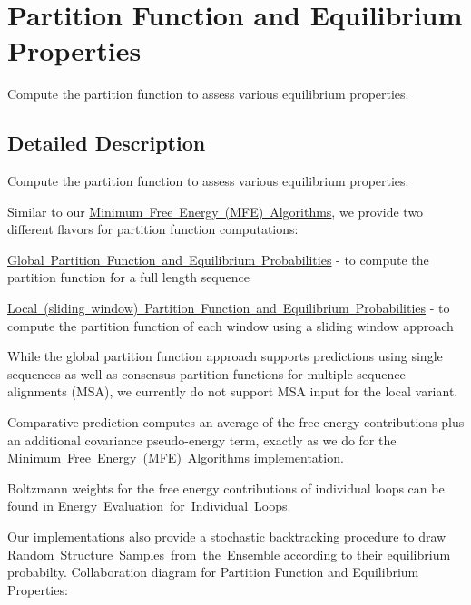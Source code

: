 \hypertarget{group__pf__fold}{}\section{Partition Function and Equilibrium Properties}
\label{group__pf__fold}


Compute the partition function to assess various equilibrium properties.  




\subsection{Detailed Description}
Compute the partition function to assess various equilibrium properties. 

Similar to our \mbox{\hyperlink{group__mfe}{Minimum Free Energy (M\+FE) Algorithms}}, we provide two different flavors for partition function computations\+:
\begin{DoxyItemize}
\item \mbox{\hyperlink{group__part__func__global}{Global Partition Function and Equilibrium Probabilities}} -\/ to compute the partition function for a full length sequence
\item \mbox{\hyperlink{group__part__func__window}{Local (sliding window) Partition Function and Equilibrium Probabilities}} -\/ to compute the partition function of each window using a sliding window approach
\end{DoxyItemize}

While the global partition function approach supports predictions using single sequences as well as consensus partition functions for multiple sequence alignments (M\+SA), we currently do not support M\+SA input for the local variant.

Comparative prediction computes an average of the free energy contributions plus an additional covariance pseudo-\/energy term, exactly as we do for the \mbox{\hyperlink{group__mfe}{Minimum Free Energy (M\+FE) Algorithms}} implementation.

Boltzmann weights for the free energy contributions of individual loops can be found in \mbox{\hyperlink{group__eval__loops}{Energy Evaluation for Individual Loops}}.

Our implementations also provide a stochastic backtracking procedure to draw \mbox{\hyperlink{group__subopt__stochbt}{Random Structure Samples from the Ensemble}} according to their equilibrium probabilty. Collaboration diagram for Partition Function and Equilibrium Properties\+:
